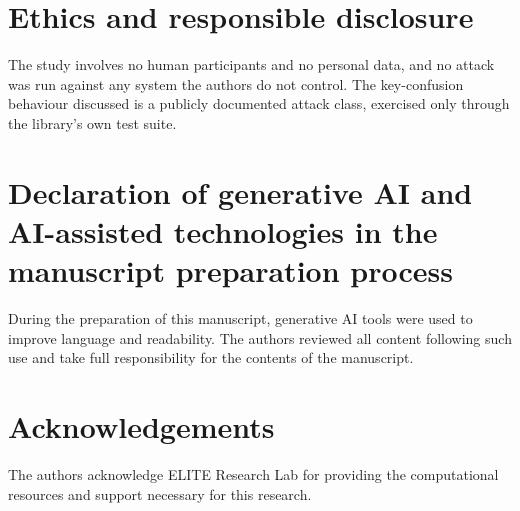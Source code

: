 \documentclass[preprint,12pt,authoryear]{elsarticle}
\begin{document}
\section*{Ethics and responsible disclosure}
The study involves no human participants and no personal data, and no attack
was run against any system the authors do not control. The key-confusion
behaviour discussed is a publicly documented attack class, exercised only
through the library's own test suite.

\section*{Declaration of generative AI and AI-assisted technologies in the
manuscript preparation process}
During the preparation of this manuscript, generative AI tools were used to
improve language and readability. The authors reviewed all content following
such use and take full responsibility for the contents of the manuscript.

\section*{Acknowledgements}
The authors acknowledge ELITE Research Lab for providing the computational
resources and support necessary for this research.

{\small\setlength{\bibsep}{1pt plus 0.3ex}

}
\end{document}
